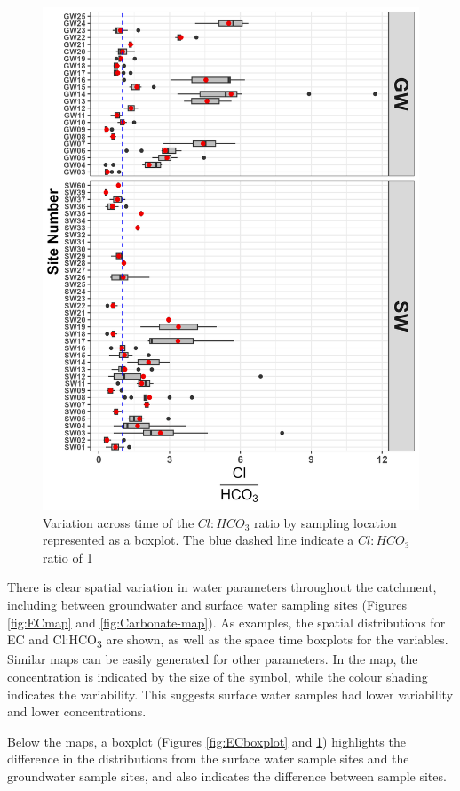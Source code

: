 \documentclass[, manuscript]{copernicus}
\begin{document}
\clearpage

\begin{figure}
\includegraphics[width=0.8\linewidth]{Figures/clhco3_plot} \caption{Variation across time of the $Cl:HCO_3$ ratio by sampling location represented as a boxplot. The blue dashed line indicate a $Cl:HCO_3$ ratio of 1}\label{fig:Carbonate-boxplot}
\end{figure}

There is clear spatial variation in water parameters throughout the
catchment, including between groundwater and surface water sampling
sites (Figures \ref{fig:ECmap} and \ref{fig:Carbonate-map}). As
examples, the spatial distributions for EC and Cl:HCO\textsubscript{3}
are shown, as well as the space time boxplots for the variables. Similar
maps can be easily generated for other parameters. In the map, the
concentration is indicated by the size of the symbol, while the colour
shading indicates the variability. This suggests surface water samples
had lower variability and lower concentrations.

Below the maps, a boxplot (Figures \ref{fig:ECboxplot} and
\ref{fig:Carbonate-boxplot}) highlights the difference in the
distributions from the surface water sample sites and the groundwater
sample sites, and also indicates the difference between sample sites.
\end{document}
